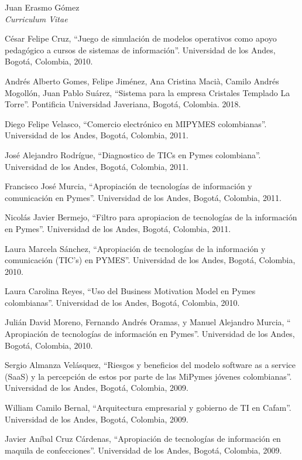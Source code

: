 \documentclass[10pt]{article}
\newenvironment{subbulletlist}{%
  \begin{list}{\labelitemii}{%
      \setlength{\topsep}{\itemsep}\setlength{\parskip}{\parsep}%
    }%
  }%
  { \end{list} }
\begin{document}
\begin{cv}{Juan Erasmo Gómez\\{\large \itshape Curriculum Vitae}}
\begin{cvlist}{}
\begin{subbulletlist}
    \item César Felipe Cruz, ``Juego de simulación de modelos operativos como apoyo pedagógico a cursos de sistemas de información''. Universidad de los Andes, Bogotá, Colombia, 2010.
    \end{subbulletlist}
  \item \textbf{}
    \begin{subbulletlist}
    \item Andrés Alberto Gomes, Felipe Jiménez, Ana Cristina Macià, Camilo Andrés Mogollón,  Juan Pablo Suárez, ``Sistema para la empresa Cristales Templado La Torre''. Pontificia Universidad Javeriana, Bogotá, Colombia. 2018.
    \item Diego Felipe Velasco, ``Comercio electrónico en MIPYMES colombianas''. Universidad de los Andes, Bogotá, Colombia, 2011.
    \item José Alejandro Rodrígue, ``Diagnostico de TICs en Pymes colombiana''. Universidad de los Andes, Bogotá, Colombia, 2011.
    \item Francisco José Murcia, ``Apropiación de tecnologías de información y comunicación en Pymes''. Universidad de los Andes, Bogotá, Colombia, 2011.
    \item Nicolás Javier Bermejo, ``Filtro para apropiacion de tecnologías de la información en Pymes''. Universidad de los Andes, Bogotá, Colombia, 2011.  
    \item  Laura Marcela Sánchez, ``Apropiación de tecnologías de la información y comunicación (TIC's) en PYMES''. Universidad de los Andes, Bogotá, Colombia, 2010.
    \item  Laura Carolina Reyes, ``Uso del Business Motivation Model en Pymes colombianas''. Universidad de los Andes, Bogotá, Colombia, 2010.
    \item  Julián David Moreno, Fernando Andrés Oramas, y Manuel Alejandro Murcia, `` Apropiación de tecnologías de información en Pymes''. Universidad de los Andes, Bogotá, Colombia, 2010.
    \item Sergio Almanza Velásquez, ``Riesgos y beneficios del modelo software as a service (SaaS) y la percepción de estos por parte de las MiPymes jóvenes colombianas''. Universidad de los Andes, Bogotá, Colombia, 2009.
      \item  William Camilo Bernal, ``Arquitectura empresarial y gobierno de TI en Cafam''. Universidad de los Andes, Bogotá, Colombia, 2009.
    \item Javier Aníbal Cruz Cárdenas, ``Apropiación de tecnologías de información en maquila de confecciones''. Universidad de los Andes, Bogotá, Colombia, 2009.
    \end{subbulletlist}
  \end{cvlist}


\end{cv}
\end{document}
